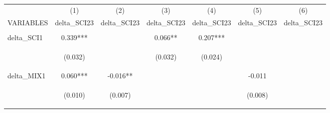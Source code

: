 \begin{center}
\begin{tabular}{lcccccc} \hline
 & (1) & (2) & (3) & (4) & (5) & (6) \\
VARIABLES & delta\_SCI23 & delta\_SCI23 & delta\_SCI23 & delta\_SCI23 & delta\_SCI23 & delta\_SCI23 \\ \hline
\vspace{4pt} & \begin{footnotesize}\end{footnotesize} & \begin{footnotesize}\end{footnotesize} & \begin{footnotesize}\end{footnotesize} & \begin{footnotesize}\end{footnotesize} & \begin{footnotesize}\end{footnotesize} & \begin{footnotesize}\end{footnotesize} \\
delta\_SCI1 & 0.339*** &  & 0.066** & 0.207*** &  &  \\
\vspace{4pt} & \begin{footnotesize}(0.032)\end{footnotesize} & \begin{footnotesize}\end{footnotesize} & \begin{footnotesize}(0.032)\end{footnotesize} & \begin{footnotesize}(0.024)\end{footnotesize} & \begin{footnotesize}\end{footnotesize} & \begin{footnotesize}\end{footnotesize} \\
delta\_MIX1 & 0.060*** & -0.016** &  &  & -0.011 &  \\
\vspace{4pt} & \begin{footnotesize}(0.010)\end{footnotesize} & \begin{footnotesize}(0.007)\end{footnotesize} & \begin{footnotesize}\end{footnotesize} & \begin{footnotesize}\end{footnotesize} & \begin{footnotesize}(0.008)\end{footnotesize} & \begin{footnotesize}\end{footnotesize} \\

\end{tabular}
\end{center}
